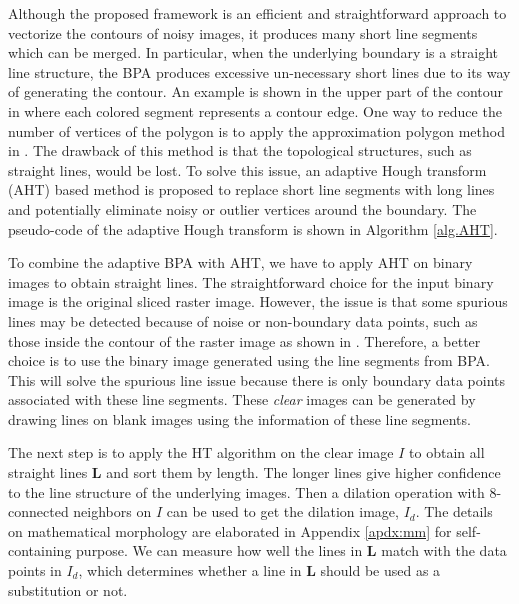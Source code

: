 Although the proposed framework is an efficient and straightforward
approach to vectorize the contours of noisy images,
it produces many short line segments which can be merged.
In particular, when the underlying boundary is a straight line structure,
the BPA produces excessive un-necessary short lines due to its way
of generating the contour.
An example is shown in the upper part of the contour in 
where each colored segment represents a contour edge.
One way to reduce the number of vertices of the polygon is to apply
the approximation polygon method in \cite{DP_AV}.
The drawback of this method is that the topological structures,
such as straight lines, would be lost.
To solve this issue, an adaptive Hough transform (AHT) based method is proposed to replace
short line segments with long lines and potentially eliminate noisy
or outlier vertices around the boundary.
The pseudo-code of the adaptive Hough transform is shown in Algorithm \ref{alg.AHT}.

To combine the adaptive BPA with AHT,
we have to apply AHT on binary images to obtain straight lines.
The straightforward choice for the input binary image
is the original sliced raster image.
However, the issue is that some spurious lines may be detected
because of noise or non-boundary data points,
such as those inside the contour of the raster image
as shown in .
Therefore, a better choice is to use the binary image
generated using the line segments from BPA.
This will solve the spurious line issue because there is only
boundary data points associated with these line segments.
These {\it clear} images can be generated by drawing lines
on blank images using the information of these line segments.

The next step is to apply the HT algorithm on the clear image $I$
to obtain all straight lines $\boldsymbol{L}$ and sort them by length.
The longer lines give higher confidence
to the line structure of the underlying images.
Then a dilation operation \cite {book_gw}
with 8-connected neighbors on $I$
can be used to get the dilation image, $I_d$.
The details on mathematical morphology are
elaborated in Appendix \ref{apdx:mm} for self-containing purpose.
We can measure how well the lines in $\boldsymbol{L}$ match with
the data points in $I_d$,
which determines whether a line in $\boldsymbol{L}$
should be used as a substitution or not.

